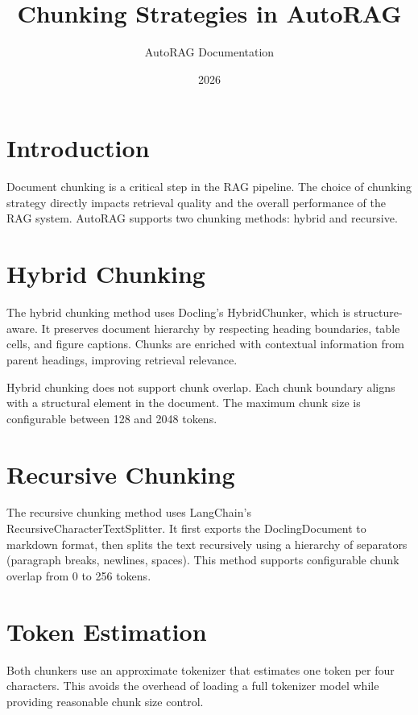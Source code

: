 \documentclass{article}
\title{Chunking Strategies in AutoRAG}
\author{AutoRAG Documentation}
\date{2026}
\begin{document}
\maketitle

\section{Introduction}
Document chunking is a critical step in the RAG pipeline. The choice of chunking strategy directly impacts retrieval quality and the overall performance of the RAG system. AutoRAG supports two chunking methods: hybrid and recursive.

\section{Hybrid Chunking}
The hybrid chunking method uses Docling's HybridChunker, which is structure-aware. It preserves document hierarchy by respecting heading boundaries, table cells, and figure captions. Chunks are enriched with contextual information from parent headings, improving retrieval relevance.

Hybrid chunking does not support chunk overlap. Each chunk boundary aligns with a structural element in the document. The maximum chunk size is configurable between 128 and 2048 tokens.

\section{Recursive Chunking}
The recursive chunking method uses LangChain's RecursiveCharacterTextSplitter. It first exports the DoclingDocument to markdown format, then splits the text recursively using a hierarchy of separators (paragraph breaks, newlines, spaces). This method supports configurable chunk overlap from 0 to 256 tokens.

\section{Token Estimation}
Both chunkers use an approximate tokenizer that estimates one token per four characters. This avoids the overhead of loading a full tokenizer model while providing reasonable chunk size control.
\end{document}
